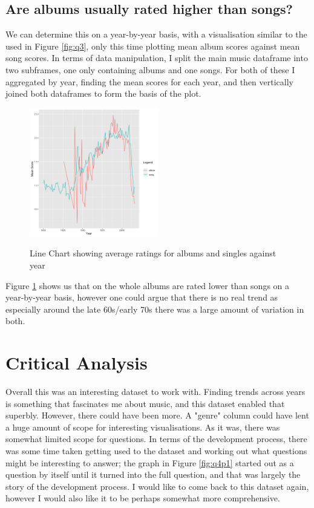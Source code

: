 \documentclass[12pt]{article}
\newcommand{\myfig}{\begin{figure}}
\begin{document}
    \subsection{Are albums usually rated higher than songs?}
        We can determine this on a year-by-year basis, with a visualisation similar to the used in Figure \ref{fig:q3}, only this time plotting mean album scores against mean song scores.
        In terms of data manipulation, I split the main music dataframe into two subframes, one only containing albums and one songs.
        For both of these I aggregated by year, finding the mean scores for each year, and then vertically joined both dataframes to form the basis of the plot.
        \myfig
          \caption{Line Chart showing average ratings for albums and singles against year}
          \includegraphics[width=0.5\textwidth]{songAlbumRates}
          \label{fig:q6}
        \end{figure}

        Figure \ref{fig:q6} shows us that on the whole albums are rated lower than songs on a year-by-year basis, however one could argue that there is no real trend as especially around the late 60s/early 70s there was a large amount of variation in both.

\section{Critical Analysis}
Overall this was an interesting dataset to work with.
Finding trends across years is something that fascinates me about music, and this dataset enabled that superbly.
However, there could have been more.
A "genre" column could have lent a huge amount of scope for interesting visualisations.
As it was, there was somewhat limited scope for questions.
In terms of the development process, there was some time taken getting used to the dataset and working out what questions might be interesting to answer; the graph in Figure \ref{fig:q4p1} started out as a question by itself until it turned into the full question, and that was largely the story of the development process.
I would like to come back to this dataset again, however I would also like it to be perhaps somewhat more comprehensive.
\end{document}
